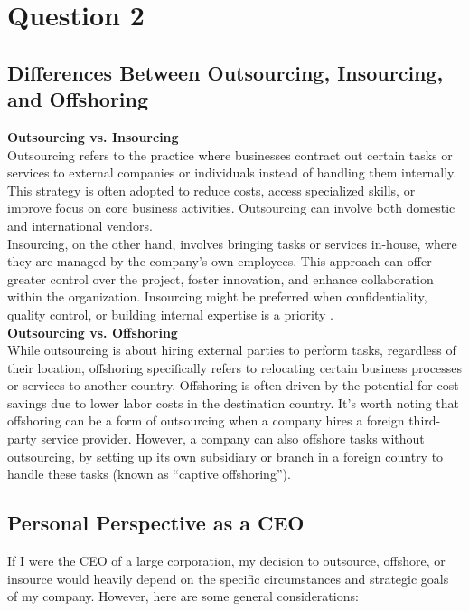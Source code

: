 \documentclass[12pt,a4paper]{article}
\begin{document}
\setcounter{page}{2}

\section{Question 2}
\subsection{Differences Between Outsourcing, Insourcing, and Offshoring}
\label{sec:Question 2}

\noindent \textbf{Outsourcing vs. Insourcing}\\
Outsourcing refers to the practice where businesses contract out certain tasks or services to external companies or individuals instead of handling them internally. This strategy is often adopted to reduce costs, access specialized skills, or improve focus on core business activities. Outsourcing can involve both domestic and international vendors.\\

\noindent Insourcing, on the other hand, involves bringing tasks or services in-house, where they are managed by the company’s own employees. This approach can offer greater control over the project, foster innovation, and enhance collaboration within the organization. Insourcing might be preferred when confidentiality, quality control, or building internal expertise is a priority \citep{question_2.1}.\\

\noindent \textbf{Outsourcing vs. Offshoring}\\
While outsourcing is about hiring external parties to perform tasks, regardless of their location, offshoring specifically refers to relocating certain business processes or services to another country. Offshoring is often driven by the potential for cost savings due to lower labor costs in the destination country. It's worth noting that offshoring can be a form of outsourcing when a company hires a foreign third-party service provider. However, a company can also offshore tasks without outsourcing, by setting up its own subsidiary or branch in a foreign country to handle these tasks (known as ``captive offshoring'').\\

\subsection{Personal Perspective as a CEO}

If I were the CEO of a large corporation, my decision to outsource, offshore, or insource would heavily depend on the specific circumstances and strategic goals of my company. However, here are some general considerations:
\end{document}
